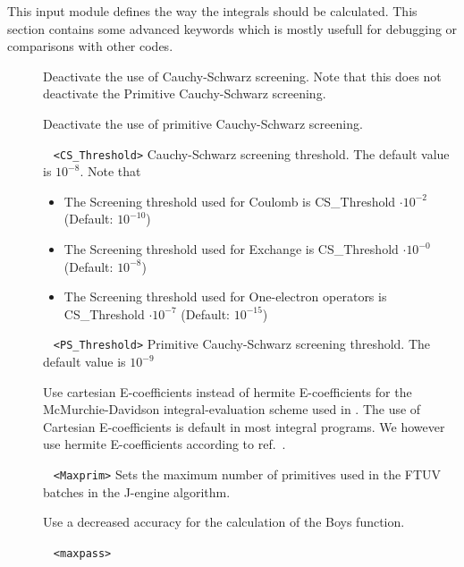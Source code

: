 This input module defines the way the integrals should be calculated. 
This section contains some advanced keywords which is mostly usefull 
for debugging or comparisons with other codes. 
\begin{description}

\item[] Deactivate the use of Cauchy-Schwarz screening. 
Note that this does not deactivate the Primitive Cauchy-Schwarz screening. 
\item[] Deactivate the use of primitive Cauchy-Schwarz screening.
\item[] 
\verb| | \newline
\verb|<CS_Threshold>|\newline
Cauchy-Schwarz screening threshold. The default value is $10^{-8}$. Note that 
\begin{itemize}
  \item The Screening threshold used for Coulomb is CS\_Threshold $\cdot 10^{-2}$ (Default: $10^{-10}$) 
  \item The Screening threshold used for Exchange is CS\_Threshold $\cdot 10^{-0}$ (Default: $10^{-8}$)
  \item The Screening threshold used for One-electron operators is CS\_Threshold $\cdot 10^{-7}$ (Default: $10^{-15}$)
\end{itemize}
\item[] 
\verb| | \newline
\verb|<PS_Threshold>|\newline
Primitive Cauchy-Schwarz screening threshold. The default value is $10^{-9}$
\item[] Use cartesian E-coefficients instead of hermite E-coefficients for the McMurchie-Davidson
integral-evaluation scheme \cite{McMurchie1978} used in \lsdalton. The use of Cartesian E-coefficients is 
default in most integral programs. We however use hermite E-coefficients according to ref.~\cite{reine:4771}.
\item[] 
\verb| | \newline
\verb|<Maxprim>|\newline
Sets the maximum number of primitives used in the FTUV batches in the J-engine algorithm.
\item[] Use a decreased accuracy for the calculation of the Boys function.
\item[] 
\verb| | \newline
\verb|<maxpass>|\newline

\end{description}
